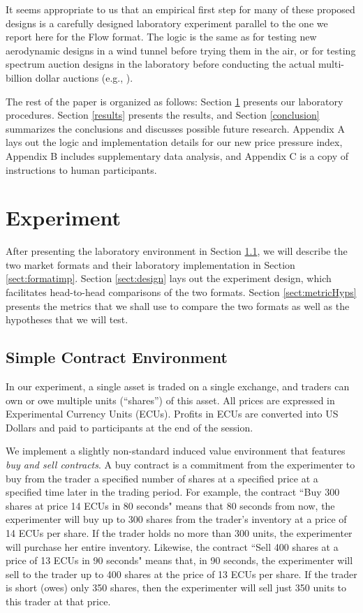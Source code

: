 \documentclass[12pt]{article}
\begin{document}
It seems appropriate to us that an empirical first step for many of these proposed designs is a carefully designed laboratory experiment parallel to the one we report here for the Flow format.
The logic is the same as for testing new aerodynamic designs in a wind tunnel before trying them in the air, or for testing spectrum auction designs in the laboratory before conducting the actual multi-billion dollar auctions (e.g., \cite{Binmore2002}).

The rest of the paper is organized as follows: Section \ref{Experiment} presents our laboratory procedures. Section \ref{results} presents the results, and Section \ref{conclusion} summarizes the conclusions and discusses possible future research. Appendix A lays out the logic and implementation details for our new price pressure index, Appendix B includes supplementary data analysis, and Appendix C is a copy of instructions to human participants.




\section{Experiment}
\label{Experiment}

After presenting the laboratory environment in Section \ref{sect:contracts}, we will describe the two market formats and their laboratory implementation in Section \ref{sect:formatimp}.
Section \ref{sect:design} lays out the experiment design, which facilitates head-to-head comparisons of the two formats. 
Section \ref{sect:metricHyps} presents the metrics that we shall use to compare the two formats as well as the hypotheses that we will test.
\subsection{Simple Contract Environment}\label{sect:contracts}

In our experiment, a single asset is traded on a single exchange, and traders can own or owe multiple units (``shares'') of this asset. All prices are expressed in Experimental Currency Units (ECUs).
Profits in ECUs are converted into US Dollars and paid to participants at the end of the session.

We implement a slightly non-standard induced value environment that features  \textit{buy and sell contracts}. 
A buy contract is a commitment from the experimenter to buy from the trader a specified number of shares at a specified price at a specified time later in the trading period. 
For example, the contract ``Buy 300 shares at price  14 ECUs in 80 seconds" means that 80 seconds from now, the experimenter will buy up to 300 shares from the trader's inventory at a price of 14 ECUs per share. If the trader holds no more than 300 units, the experimenter will purchase her entire inventory. 
Likewise, the contract ``Sell 400 shares at a price of 13 ECUs in 90 seconds" means that, in 90 seconds, the experimenter will sell to the trader up to 400 shares at the price of 13 ECUs per share. If the trader is short (owes) only 350 shares, then the experimenter will sell just 350 units to this trader at that price. 
\end{document}
